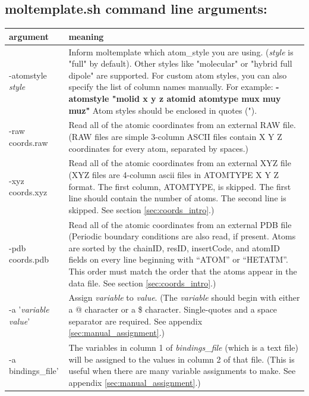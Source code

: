 \documentclass[11pt]{article}
\begin{document}



\subsection{moltemplate.sh command line arguments:}
\label{sec:args_table}
\begin{tabular}[h]{l|p{10cm}}
\textbf{argument} & \textbf{meaning}
\\
\hline
\hline
-atomstyle \textit{style}
&
Inform moltemplate which atom\_style you are using.
(\textit{style} is "full" by default).
Other styles like "molecular" or "hybrid full dipole" are supported.
For custom atom styles, you can also specify the list of column 
names manually.  For example:
\textbf{-atomstyle "molid x y z atomid atomtype mux muy muz"}
Atom styles should be enclosed in quotes (").
\\
\hline
-raw coords.raw
& 
Read all of the atomic coordinates from an external RAW file.
(RAW files are simple 3-column ASCII files contain X Y Z coordinates
 for every atom, separated by spaces.)
\\
\hline
-xyz coords.xyz
& 
Read all of the atomic coordinates from an external XYZ file 
(XYZ files are 4-column ascii files in ATOMTYPE X Y Z format. 
 The first column, ATOMTYPE, is skipped. 
 The first line should contain the number of atoms. 
 The second line is skipped. See section \ref{sec:coords_intro}.)
\\
\hline
-pdb coords.pdb
& 
Read all of the atomic coordinates from an external PDB file
(Periodic boundary conditions are also read, if present.
 Atoms are sorted by the chainID, resID, insertCode, and atomID
 fields on every line beginning with ``ATOM'' or ``HETATM''.
 This order must match the order that the atoms appear in the data file.
 See section \ref{sec:coords_intro}.)
\\
\hline
-a '\textit{variable} \textit{value}'
& 
Assign \textit{variable} to \textit{value}.
(The \textit{variable} should begin with either a @ character 
 or a \$ character.  
 Single-quotes and a space separator are required.
 See appendix \ref{sec:manual_assignment}.)
\\
\hline
-a bindings\_file'
& 
The variables in column 1 of 
\textit{bindings\_file} 
(which is a text file) 
will be assigned to 
the values in column 2 of that file.
(This is useful when there are many variable assignments to make.
See appendix \ref{sec:manual_assignment}.)

\end{tabular}
\end{document}
